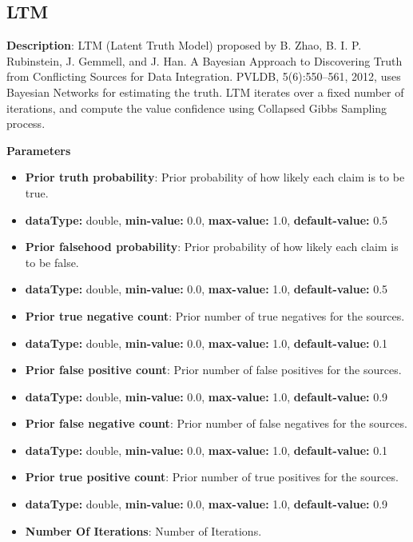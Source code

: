 \documentclass[a4paper,10pt]{scrartcl}
\begin{document}
\subsection{LTM}
\begin{description}
\item \textbf{Description}: LTM (Latent Truth Model) proposed by B. Zhao, B. I. P. Rubinstein, J. Gemmell, and J. Han. A Bayesian Approach to Discovering Truth from Conflicting Sources for Data Integration. PVLDB, 5(6):550–561, 2012, uses Bayesian Networks for estimating the truth. LTM iterates over a fixed number of iterations, and compute the value confidence using Collapsed Gibbs Sampling process.
\item \textbf{Parameters}
\begin{itemize}
\item \textbf{Prior truth probability}: Prior probability of how likely each claim is to be true.
\item[]\textbf{dataType: }double, \textbf{min-value: }0.0, \textbf{max-value: }1.0, \textbf{default-value: }0.5\item \textbf{Prior falsehood probability}: Prior probability of how likely each claim is to be false.
\item[]\textbf{dataType: }double, \textbf{min-value: }0.0, \textbf{max-value: }1.0, \textbf{default-value: }0.5\item \textbf{Prior true negative count}: Prior number of true negatives for the sources.
\item[]\textbf{dataType: }double, \textbf{min-value: }0.0, \textbf{max-value: }1.0, \textbf{default-value: }0.1\item \textbf{Prior false positive count}: Prior number of false positives for the sources.
\item[]\textbf{dataType: }double, \textbf{min-value: }0.0, \textbf{max-value: }1.0, \textbf{default-value: }0.9\item \textbf{Prior false negative count}: Prior number of false negatives for the sources.
\item[]\textbf{dataType: }double, \textbf{min-value: }0.0, \textbf{max-value: }1.0, \textbf{default-value: }0.1\item \textbf{Prior true positive count}: Prior number of true positives for the sources.
\item[]\textbf{dataType: }double, \textbf{min-value: }0.0, \textbf{max-value: }1.0, \textbf{default-value: }0.9\item \textbf{Number Of Iterations}: Number of Iterations.

\end{itemize}
\end{description}
\end{document}
